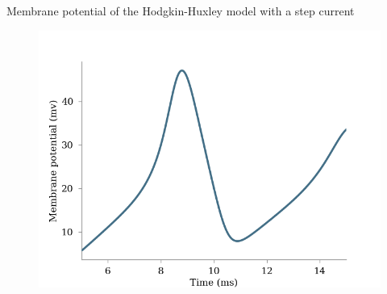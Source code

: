 \documentclass[presentation]{beamer}
\begin{document}











\begin{frame}{Membrane potential of the Hodgkin-Huxley model with a step current}
  \vspace{-5mm}
  \begin{figure}
    \includegraphics[width=\textwidth]{hh_single.png}
  \end{figure}

\end{frame}
\end{document}
